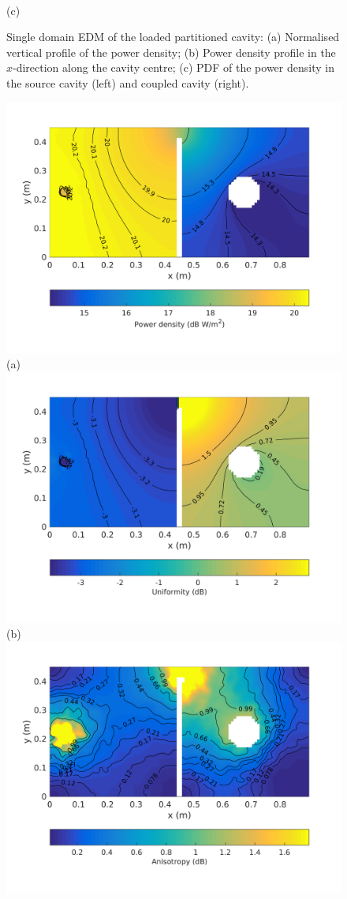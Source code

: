\documentclass[a4paper]{article}
\numberwithin{equation}{section}
\begin{document}
\begin{figure}[ht]
\begin{center}
\\
{\footnotesize (c)}\\
\vspace{-2mm}
\caption{\label{fg:partcylsdm_profs} Single domain EDM of the loaded partitioned cavity: (a) Normalised vertical profile of the power density; 
(b) Power density profile in the $x$-direction along the cavity centre; (c) PDF of the power density in the source cavity (left) and coupled cavity (right).}
\end{center}
\end{figure}

\begin{figure}[ht]
\begin{center}
\includegraphics[trim={0 8mm 0 12mm},clip,width=0.52\linewidth]{figures/SDM_3D_DL_PowerDensityMap}\\
{\footnotesize (a)}\\
\vspace{2mm}
\includegraphics[trim={0 8mm 0 12mm},clip,width=0.52\linewidth]{figures/SDM_3D_DL_EnergyDensityUniformityMap}\\
{\footnotesize (b)}\\
\vspace{2mm}
\includegraphics[trim={0 8mm 0 12mm},clip,width=0.52\linewidth]{figures/SDM_3D_DL_EnergyDensityAnisotropyMap}\\

\end{center}
\end{figure}
\end{document}
